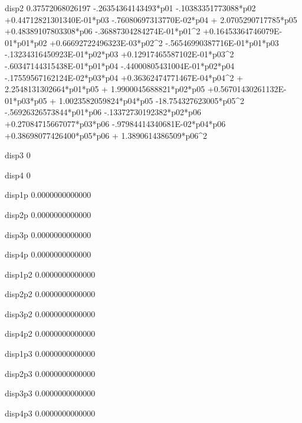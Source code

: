  disp2  
  0.37572068026197  -.26354364143493*p01  -.10383351773088*p02 +0.44712821301340E-01*p03  -.76080697313770E-02*p04 + 2.0705290717785*p05 +0.48389107803308*p06  -.36887304284274E-01*p01^2 +0.16453364746079E-01*p01*p02 +0.66692722496323E-03*p02^2  -.56546990387716E-01*p01*p03  -.13234316450923E-01*p02*p03 +0.12917465587102E-01*p03^2  -.60347144315438E-01*p01*p04  -.44000805431004E-01*p02*p04  -.17559567162124E-02*p03*p04 +0.36362474771467E-04*p04^2 + 2.2548131302664*p01*p05 + 1.9900045688821*p02*p05 +0.56701430261132E-01*p03*p05 + 1.0023582059824*p04*p05  -18.754327623005*p05^2  -.56926326573844*p01*p06  -.13372730192382*p02*p06 +0.27084715667077*p03*p06  -.97984414340681E-02*p04*p06 +0.38698077426400*p05*p06 + 1.3890614386509*p06^2 
  
 disp3  
 0 
  
 disp4  
 0 
  
 disp1p 
   0.0000000000000 
  
 disp2p 
   0.0000000000000 
  
 disp3p 
   0.0000000000000 
  
 disp4p 
   0.0000000000000 
  
 disp1p2
   0.0000000000000 
  
 disp2p2
   0.0000000000000 
  
 disp3p2
   0.0000000000000 
  
 disp4p2
   0.0000000000000 
  
 disp1p3
   0.0000000000000 
  
 disp2p3
   0.0000000000000 
  
 disp3p3
   0.0000000000000 
  
 disp4p3
   0.0000000000000 
  

